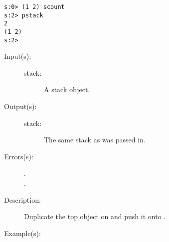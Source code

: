 \begin{description}
\begin{description}
\begin{verbatim}
s:0> (1 2) scount
s:2> pstack
2
(1 2)
s:2>
		\end{verbatim}
	\end{description}
\label{systemdict:sdup}
\item[{\onyxop{stack}{sdup}{stack}}: ]
	\begin{description}\item[]
	\item[Input(s): ]
		\begin{description}\item[]
		\item[stack: ]
			A stack object.
		\end{description}
	\item[Output(s): ]
		\begin{description}\item[]
		\item[stack: ]
			The same stack as was passed in.
		\end{description}
	\item[Errors(s): ]
		\begin{description}\item[]
		\item[.]
		\item[.]
		\end{description}
	\item[Description: ]
		Duplicate the top object on  and push it onto
		.
	\item[Example(s): ]\begin{verbatim}


\end{verbatim}
\end{description}
\end{description}
